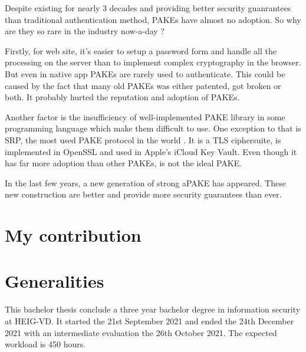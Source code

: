 \documentclass[../report.tex]{subfiles}
\begin{document}


Despite existing for nearly 3 decades and providing better security guanrantees than traditional authentication method, PAKEs have almost no adoption. So why are they so rare in the industry now-a-day ?

Firstly, for web site, it's easier to setup a password form and handle all the processing on the server than to implement complex cryptography in the browser. But even in native app PAKEs are rarely used to authenticate.
This could be caused by the fact that many old PAKEs was either patented, got broken or both. %
It probably hurted the reputation and adoption of PAKEs.

Another factor is the insufficiency of well-implemented PAKE library in some programming language %
which make them difficult to use.
One exception to that is SRP, the most used PAKE protocol in the world \cite{PAKE_Green_blog}.
It is a TLS ciphersuite, is implemented in OpenSSL and used in Apple's iCloud Key Vault. Even though it has far more adoption than other PAKEs, is not the ideal PAKE.


In the last few years, a new generation of strong aPAKE \cite{OPAQUE_Paper, KHAPE_Paper} has appeared. These new construction are better and provide more security guarantees than ever.




\section{My contribution}


\section{Generalities}

This bachelor thesis conclude a three year bachelor degree in information security at HEIG-VD.
It started the 21st September 2021 and ended the 24th December 2021 with an intermediate evaluation the 26th October 2021. The expected workload is 450 hours.
\end{document}
